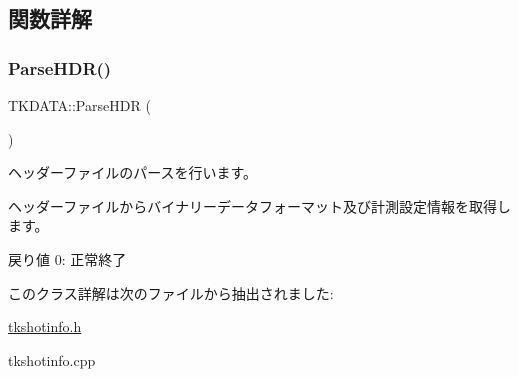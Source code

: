 \subsection{関数詳解}
\mbox{\label{class_t_k_d_a_t_a_aa3908aef9f0e122bf8edf4ae39242304}} 
\subsubsection{\texorpdfstring{Parse\+H\+D\+R()}{ParseHDR()}}
{\footnotesize\ttfamily T\+K\+D\+A\+T\+A\+::\+Parse\+H\+DR (\begin{DoxyParamCaption}{ }\end{DoxyParamCaption})}

ヘッダーファイルのパースを行います。

ヘッダーファイルからバイナリーデータフォーマット及び計測設定情報を取得します。 \begin{DoxyReturn}{戻り値}
0\+: 正常終了 
\end{DoxyReturn}


このクラス詳解は次のファイルから抽出されました\+:\begin{DoxyCompactItemize}
\item 
\hyperlink{tkshotinfo_8h}{tkshotinfo.\+h}\item 
tkshotinfo.\+cpp\end{DoxyCompactItemize}
